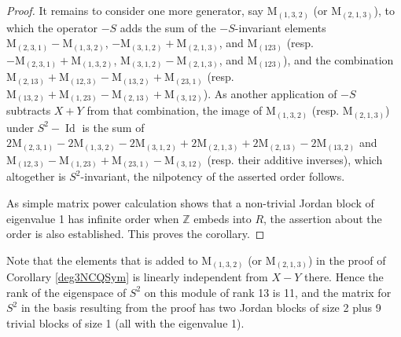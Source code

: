 \documentclass{article}
\theoremstyle{definition}
\begin{document}
\begin{proof}
It remains to consider one more generator, say $\mathrm{M}_{(1,3,2)}$ (or $\mathrm{M}_{(2,1,3)}$), to which the operator $-S$ adds the sum of the $-S$-invariant elements $\mathrm{M}_{(2,3,1)}-\mathrm{M}_{(1,3,2)}$, $-\mathrm{M}_{(3,1,2)}+\mathrm{M}_{(2,1,3)}$, and $\mathrm{M}_{(123)}$ (resp. $-\mathrm{M}_{(2,3,1)}+\mathrm{M}_{(1,3,2)}$, $\mathrm{M}_{(3,1,2)}-\mathrm{M}_{(2,1,3)}$, and $\mathrm{M}_{(123)}$), and the combination $\mathrm{M}_{(2,13)}+\mathrm{M}_{(12,3)}-\mathrm{M}_{(13,2)}+\mathrm{M}_{(23,1)}$ (resp. $\mathrm{M}_{(13,2)}+\mathrm{M}_{(1,23)}-\mathrm{M}_{(2,13)}+\mathrm{M}_{(3,12)}$). As another application of $-S$ subtracts $X+Y$ from that combination, the image of $\mathrm{M}_{(1,3,2)}$ (resp. $\mathrm{M}_{(2,1,3)}$) under $S^{2}-\operatorname{Id}$ is the sum of $2\mathrm{M}_{(2,3,1)}-2\mathrm{M}_{(1,3,2)}-2\mathrm{M}_{(3,1,2)}+2\mathrm{M}_{(2,1,3)}+2\mathrm{M}_{(2,13)}-2\mathrm{M}_{(13,2)}$ and $\mathrm{M}_{(12,3)}-\mathrm{M}_{(1,23)}+\mathrm{M}_{(23,1)}-\mathrm{M}_{(3,12)}$ (resp. their additive inverses), which altogether is $S^{2}$-invariant, the nilpotency of the asserted order follows.

As simple matrix power calculation shows that a non-trivial Jordan block of eigenvalue 1 has infinite order when $\mathbb{Z}$ embeds into $R$, the assertion about the order is also established. This proves the corollary.
\end{proof}
Note that the elements that is added to $\mathrm{M}_{(1,3,2)}$ (or $\mathrm{M}_{(2,1,3)}$) in the proof of Corollary \ref{deg3NCQSym} is linearly independent from $X-Y$ there. Hence the rank of the eigenspace of $S^{2}$ on this module of rank 13 is 11, and the matrix for $S^{2}$ in the basis resulting from the proof has two Jordan blocks of size 2 plus 9 trivial blocks of size 1 (all with the eigenvalue 1).
\end{document}
